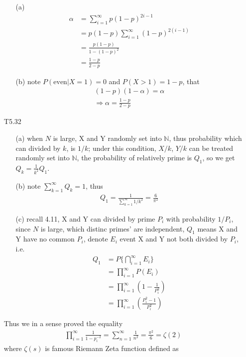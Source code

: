 \documentclass[paper=a4, fontsize=11pt]{scrartcl} %
\numberwithin{equation}{section} %
\numberwithin{figure}{section} %
\numberwithin{table}{section} %
\begin{document}
\begin{itemize}
	\begin{itemize}
		\item[(a)]
		\begin{align}
			\alpha &= \sum_{i=1}^\infty  p(1-p)^{2i-1} \\
				&= p(1-p) \sum_{i=1}^\infty (1-p)^{2(i-1)} \\
				&= \frac{p(1-p)}{1-(1-p)^2} \\
				&= \frac{1-p}{2-p}
		\end{align}
		\item[(b)] note $P(\text{even}|X=1)=0$ and $P(X>1)=1-p$, that
		\begin{align}
			(1-p)(1-\alpha) = \alpha \\
			\Rightarrow \alpha = \frac{1-p}{2-p}
		\end{align}
	\end{itemize}
	\item[T5.32]
	\begin{itemize}
		\item[(a)] when $N$ is large, X and Y randomly set into $\mathbb{N}$, thus probability which can divided by $k$, is $1/k$; under this condition, $X/k$, $Y/k$ can be treated randomly set into $\mathbb{N}$, the probability of relatively prime is $Q_1$, so we get $Q_k = \frac{1}{k^2}Q_1$.
		\item[(b)] note $\sum_{k=1}^\infty Q_k =1$, thus
		\begin{align}
			Q_1 = \frac{1}{\sum_{k=1}^\infty 1/k^2} = \frac{6}{\pi^2}
		\end{align} 
		\item[(c)] recall 4.11, X and Y can divided by prime $P_i$ with probability $1/P_i$, since $N$ is large, which distinc primes' are independent, $Q_1$ means X and Y have no common $P_i$, denote $E_i$ event X and Y not both divided by $P_i$, i.e. 
		\begin{align}
			Q_1 &= P\{\bigcap_{i=1}^\infty E_i\} \\
				&= \prod_{i=1}^\infty P(E_i) \\
				&= \prod_{i=1}^\infty (1-\frac{1}{P_i^2})\\
				&= \prod_{i=1}^\infty (\frac{P_i^2-1}{P_i^2})
		\end{align}
	\end{itemize}
	Thus we in a sense proved the equality
	\begin{align}
		\prod_{i=1}^\infty \frac{1}{1-p_i^{-2}} = \sum_{n=1}^\infty \frac{1}{n^2} = \frac{\pi^2}{6} = \zeta(2)
	\end{align}
	where $\zeta(s)$ is famous Riemann Zeta function defined as

\end{itemize}
\end{document}

